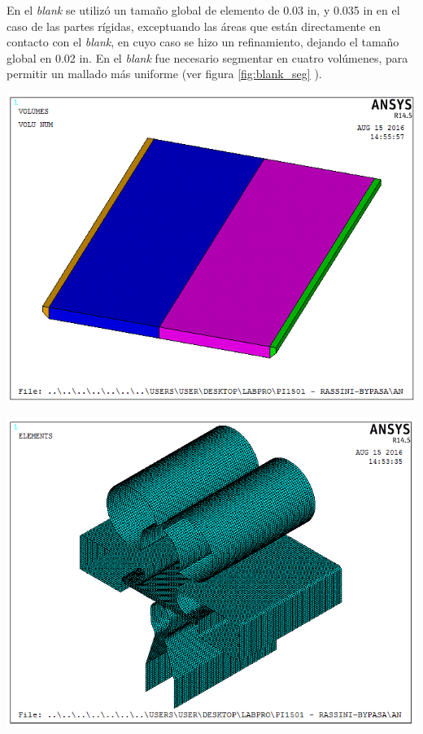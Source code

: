 En el \textit{blank} se utilizó un tamaño global de elemento de 0.03 in, y 0.035 in en el caso de las partes 
rígidas, exceptuando las áreas que están directamente en contacto con el \textit{blank}, en cuyo caso se hizo 
un refinamiento, dejando el tamaño global en 0.02 in. En el \textit{blank} fue necesario segmentar en cuatro 
volúmenes, para permitir un mallado más uniforme (ver figura \ref{fig:blank_seg} ).


\begin{center}
\includegraphics[scale=0.6]{src/ch3/blank_segmentado.png}
\label{fig:blank_seg}
\end{center}



\begin{center}
\includegraphics[scale=0.6]{src/ch3/mesh_assembly_01.png}
\label{fig:mesh_assembly01}
\end{center}

